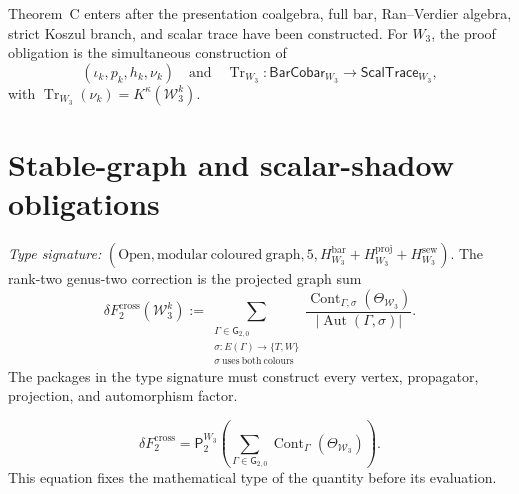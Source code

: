 \begin{remark}
\label{rem:w3hol-theorem-c-scope}
Theorem~C enters after the presentation coalgebra, full bar,
Ran--Verdier algebra, strict Koszul branch, and scalar trace have been
constructed.  For \(W_3\), the proof obligation is the simultaneous
construction of
\[
(\iota_k,p_k,h_k,\nu_k)
\quad\text{and}\quad
\operatorname{Tr}_{W_3}\colon
\mathsf{BarCobar}_{W_3}\longrightarrow
\mathsf{ScalTrace}_{W_3},
\]
with
\(\operatorname{Tr}_{W_3}(\nu_k)=K^\kappa(\mathcal W_3^k)\).
\end{remark}

\section{Stable-graph and scalar-shadow obligations}
\label{sec:w3hol-genus-2}

\begin{theorem}
\label{thm:w3hol-deltaF2}
\emph{Type signature:}
\((\mathrm{Open},\mathrm{modular\ coloured\ graph},5,
H_{W_3}^{\mathrm{bar}}+
H_{W_3}^{\mathrm{proj}}+
H_{W_3}^{\mathrm{sew}})\).
The rank-two genus-two correction is the projected graph sum
\begin{equation}\label{eq:w3hol-deltaF2}
\delta F_{2}^{\mathrm{cross}}(\mathcal W_3^k)
:=
\sum_{\substack{\Gamma\in\mathsf G_{2,0}\\
\sigma:E(\Gamma)\to\{T,W\}\\
\sigma\ \mathrm{uses\ both\ colours}}}
\frac{\operatorname{Cont}_{\Gamma,\sigma}(\Theta_{\mathcal W_3})}
{|\operatorname{Aut}(\Gamma,\sigma)|}.
\end{equation}
The packages in the type signature must construct every vertex,
propagator, projection, and automorphism factor.
\end{theorem}

\begin{equation}\label{eq:w3hol-deltaF2-graph-decomp}
\delta F_{2}^{\mathrm{cross}}
=
\mathsf P_{2}^{W_3}
\left(
\sum_{\Gamma\in\mathsf G_{2,0}}
\operatorname{Cont}_{\Gamma}(\Theta_{\mathcal W_3})
\right).
\end{equation}
This equation fixes the mathematical type of the quantity before its
evaluation.

